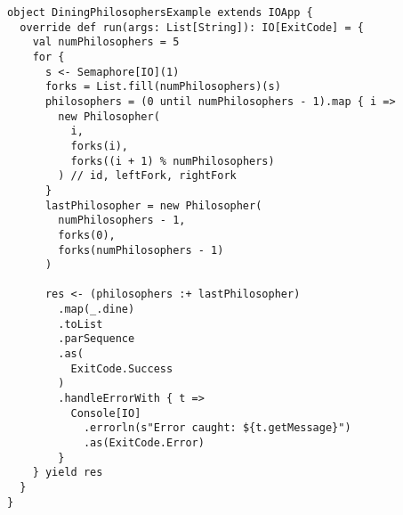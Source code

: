 \begin{verbatim}
object DiningPhilosophersExample extends IOApp {
  override def run(args: List[String]): IO[ExitCode] = {
    val numPhilosophers = 5
    for {
      s <- Semaphore[IO](1)
      forks = List.fill(numPhilosophers)(s)
      philosophers = (0 until numPhilosophers - 1).map { i =>
        new Philosopher(
          i,
          forks(i),
          forks((i + 1) % numPhilosophers)
        ) // id, leftFork, rightFork
      }
      lastPhilosopher = new Philosopher(
        numPhilosophers - 1,
        forks(0),
        forks(numPhilosophers - 1)
      )

      res <- (philosophers :+ lastPhilosopher)
        .map(_.dine)
        .toList
        .parSequence
        .as(
          ExitCode.Success
        )
        .handleErrorWith { t =>
          Console[IO]
            .errorln(s"Error caught: ${t.getMessage}")
            .as(ExitCode.Error)
        }
    } yield res
  }
} 
\end{verbatim}